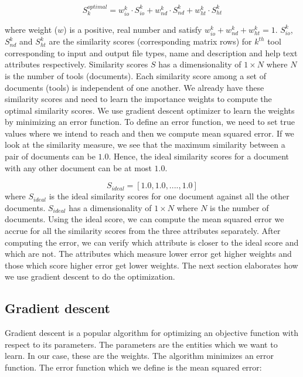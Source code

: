 \begin{equation}
S_k^{optimal} = w^k_{io} \cdot S^k_{io} +  w^k_{nd} \cdot S^k_{nd} + w^k_{ht} \cdot S^k_{ht}
\end{equation}

where weight ($w$) is a positive, real number and satisfy $w^k_{io} + w^k_{nd} + w^k_{ht} = 1$. 
$S^k_{io}$, $S^k_{nd}$ and $S^k_{ht}$ are the similarity scores (corresponding matrix rows) for $k^{th}$ tool corresponding to input and output file types, name and description and help text attributes respectively. Similarity scores $S$ has a dimensionality of $1 \times N$ where $N$ is the number of tools (documents). Each similarity score among a set of documents (tools) is independent of one another. We already have these similarity scores and need to learn the importance weights to compute the optimal similarity scores. We use gradient descent optimizer to learn the weights by minimizing an error function. To define an error function, we need to set true values where we intend to reach and then we compute mean squared error. If we look at the similarity measure, we see that the maximum similarity between a pair of documents can be $1.0$. Hence, the ideal similarity scores for a document with any other document can be at most $1.0$.

\begin{equation}
S_{ideal} = [ 1.0, 1.0, ...., 1.0 ]
\end{equation}
where $S_{ideal}$ is the ideal similarity scores for one document against all the other documents. $S_{ideal}$ has a dimensionality of $1 \times N$ where $N$ is the number of documents. Using the ideal score, we can compute the mean squared error we accrue for all the similarity scores from the three attributes separately. After computing the error, we can verify which attribute is closer to the ideal score and which are not. The attributes which measure lower error get higher weights and those which score higher error get lower weights. The next section elaborates how we use gradient descent to do the optimization.

\subsection{Gradient descent}
Gradient descent is a popular algorithm for optimizing an objective function with respect to its parameters. The parameters are the entities which we want to learn. In our case, these are the weights. The algorithm minimizes an error function. The error function which we define is the mean squared error:

